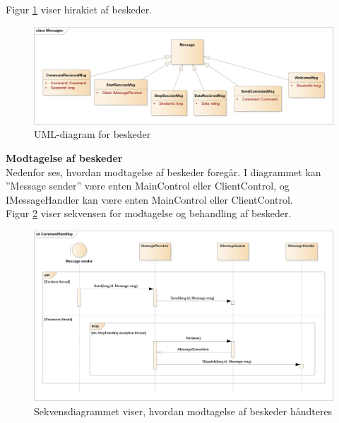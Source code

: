 Figur \ref{fig:CSBeskeder} viser hirakiet af beskeder.

\begin{figure}[H]
    \centering
    \includegraphics[width=1\textwidth]{Systemdesign/CentralServer/Images/Beskeder.png}
    \caption{UML-diagram for beskeder}
    \label{fig:CSBeskeder}
\end{figure}


\textbf{Modtagelse af beskeder}\\
Nedenfor ses, hvordan modtagelse af beskeder foregår. I diagrammet kan ”Message sender” være enten MainControl eller ClientControl, og IMessageHandler kan være enten MainControl eller ClientControl.\\

Figur \ref{fig:CSModtagelseAfBeskeder} viser sekvensen for modtagelse og behandling af beskeder.

\begin{figure}[H]
    \centering
    \includegraphics[width=1\textwidth]{Systemdesign/CentralServer/Images/ModtagelseAfBeskeder.png}
    \caption{Sekvensdiagrammet viser, hvordan modtagelse af beskeder håndteres}
    \label{fig:CSModtagelseAfBeskeder}
\end{figure}
